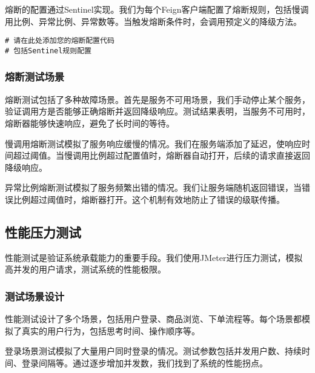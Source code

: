 \documentclass[a4paper,12pt]{article}
\begin{document}
熔断的配置通过Sentinel实现。我们为每个Feign客户端配置了熔断规则，包括慢调用比例、异常比例、异常数等。当触发熔断条件时，会调用预定义的降级方法。

\begin{lstlisting}[caption=熔断配置示例]
# 请在此处添加您的熔断配置代码
# 包括Sentinel规则配置
\end{lstlisting}

\subsubsection{熔断测试场景}

熔断测试包括了多种故障场景。首先是服务不可用场景，我们手动停止某个服务，验证调用方是否能够正确熔断并返回降级响应。测试结果表明，当服务不可用时，熔断器能够快速响应，避免了长时间的等待。

慢调用熔断测试模拟了服务响应缓慢的情况。我们在服务端添加了延迟，使响应时间超过阈值。当慢调用比例超过配置值时，熔断器自动打开，后续的请求直接返回降级响应。

异常比例熔断测试模拟了服务频繁出错的情况。我们让服务端随机返回错误，当错误比例超过阈值时，熔断器打开。这个机制有效地防止了错误的级联传播。

\begin{center}
\end{center}

\subsection{性能压力测试}

性能测试是验证系统承载能力的重要手段。我们使用JMeter进行压力测试，模拟高并发的用户请求，测试系统的性能极限。

\subsubsection{测试场景设计}

性能测试设计了多个场景，包括用户登录、商品浏览、下单流程等。每个场景都模拟了真实的用户行为，包括思考时间、操作顺序等。

登录场景测试模拟了大量用户同时登录的情况。测试参数包括并发用户数、持续时间、登录间隔等。通过逐步增加并发数，我们找到了系统的性能拐点。
\end{document}
